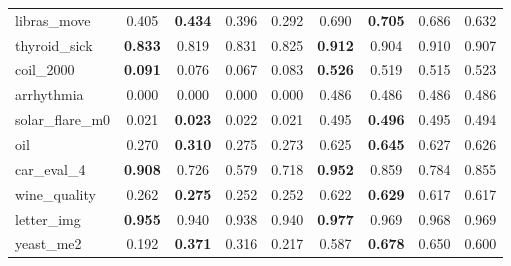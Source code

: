 \begin{figure}[ht]
\begin{tabular}{p{22mm}|*4{p{14mm}}|*4{p{14mm}}}
        libras\_move&\multicolumn{1}{c}{0.405}&\multicolumn{1}{c}{\textbf{0.434}}&\multicolumn{1}{c}{0.396}&\multicolumn{1}{c|}{0.292}&\multicolumn{1}{c}{0.690}&\multicolumn{1}{c}{\textbf{0.705}}&\multicolumn{1}{c}{0.686}&\multicolumn{1}{c}{0.632}\\
        thyroid\_sick&\multicolumn{1}{c}{\textbf{0.833}}&\multicolumn{1}{c}{0.819}&\multicolumn{1}{c}{0.831}&\multicolumn{1}{c|}{0.825}&\multicolumn{1}{c}{\textbf{0.912}}&\multicolumn{1}{c}{0.904}&\multicolumn{1}{c}{0.910}&\multicolumn{1}{c}{0.907}\\
        coil\_2000&\multicolumn{1}{c}{\textbf{0.091}}&\multicolumn{1}{c}{0.076}&\multicolumn{1}{c}{0.067}&\multicolumn{1}{c|}{0.083}&\multicolumn{1}{c}{\textbf{0.526}}&\multicolumn{1}{c}{0.519}&\multicolumn{1}{c}{0.515}&\multicolumn{1}{c}{0.523}\\
        arrhythmia&\multicolumn{1}{c}{0.000}&\multicolumn{1}{c}{0.000}&\multicolumn{1}{c}{0.000}&\multicolumn{1}{c|}{0.000}&\multicolumn{1}{c}{0.486}&\multicolumn{1}{c}{0.486}&\multicolumn{1}{c}{0.486}&\multicolumn{1}{c}{0.486}\\
        solar\_flare\_m0&\multicolumn{1}{c}{0.021}&\multicolumn{1}{c}{\textbf{0.023}}&\multicolumn{1}{c}{0.022}&\multicolumn{1}{c|}{0.021}&\multicolumn{1}{c}{0.495}&\multicolumn{1}{c}{\textbf{0.496}}&\multicolumn{1}{c}{0.495}&\multicolumn{1}{c}{0.494}\\
        oil&\multicolumn{1}{c}{0.270}&\multicolumn{1}{c}{\textbf{0.310}}&\multicolumn{1}{c}{0.275}&\multicolumn{1}{c|}{0.273}&\multicolumn{1}{c}{0.625}&\multicolumn{1}{c}{\textbf{0.645}}&\multicolumn{1}{c}{0.627}&\multicolumn{1}{c}{0.626}\\
        car\_eval\_4&\multicolumn{1}{c}{\textbf{0.908}}&\multicolumn{1}{c}{0.726}&\multicolumn{1}{c}{0.579}&\multicolumn{1}{c|}{0.718}&\multicolumn{1}{c}{\textbf{0.952}}&\multicolumn{1}{c}{0.859}&\multicolumn{1}{c}{0.784}&\multicolumn{1}{c}{0.855}\\
        wine\_quality&\multicolumn{1}{c}{0.262}&\multicolumn{1}{c}{\textbf{0.275}}&\multicolumn{1}{c}{0.252}&\multicolumn{1}{c|}{0.252}&\multicolumn{1}{c}{0.622}&\multicolumn{1}{c}{\textbf{0.629}}&\multicolumn{1}{c}{0.617}&\multicolumn{1}{c}{0.617}\\
        letter\_img&\multicolumn{1}{c}{\textbf{0.955}}&\multicolumn{1}{c}{0.940}&\multicolumn{1}{c}{0.938}&\multicolumn{1}{c|}{0.940}&\multicolumn{1}{c}{\textbf{0.977}}&\multicolumn{1}{c}{0.969}&\multicolumn{1}{c}{0.968}&\multicolumn{1}{c}{0.969}\\
        yeast\_me2&\multicolumn{1}{c}{0.192}&\multicolumn{1}{c}{\textbf{0.371}}&\multicolumn{1}{c}{0.316}&\multicolumn{1}{c|}{0.217}&\multicolumn{1}{c}{0.587}&\multicolumn{1}{c}{\textbf{0.678}}&\multicolumn{1}{c}{0.650}&\multicolumn{1}{c}{0.600}\\

\end{tabular}
\end{figure}
